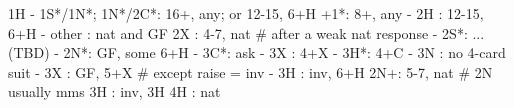 1H - 1S*/1N*; 1N*/2C*: 16+, any; or 12-15, 6+H
+1*: 8+, any
   - 2H : 12-15, 6+H
   - other : nat and GF
2X : 4-7, nat
# after a weak nat response
   - 2S*: ... (TBD)
   - 2N*: GF, some 6+H
        - 3C*: ask
             - 3X : 4+X
             - 3H*: 4+C
             - 3N : no 4-card suit
   - 3X : GF, 5+X  # except raise = inv
   - 3H : inv, 6+H
2N+: 5-7, nat  # 2N usually mms
3H : inv, 3H
4H : nat
